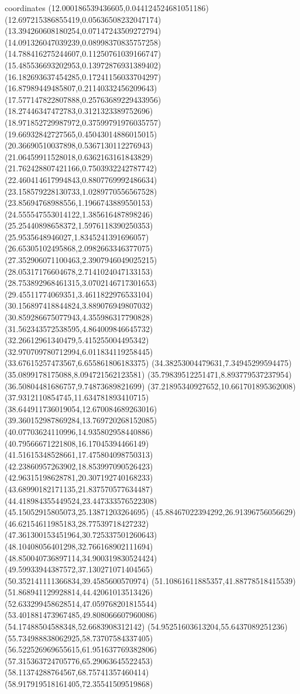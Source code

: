 coordinates {%
(12.000186539436605,0.044124524681051186)
(12.697215386855419,0.05636508232047174)
(13.394260608180254,0.07147243509272794)
(14.091326047039239,0.08998370835757258)
(14.788416275244607,0.11250761039166747)
(15.485536693202953,0.13972876931389402)
(16.182693637454285,0.17241156033704297)
(16.87989449485807,0.21140332456209643)
(17.577147822807888,0.25763689229433956)
(18.27446347472783,0.3121323389752696)
(18.971852729987972,0.37599791976035757)
(19.66932842727565,0.45043014886015015)
(20.36690510037898,0.5367130112276943)
(21.06459911528018,0.6362163161843829)
(21.762428807421166,0.7503932242787742)
(22.460414617994843,0.8807769992486634)
(23.158579228130733,1.0289770556567528)
(23.85694768988556,1.1966743889550153)
(24.555547553014122,1.385616487898246)
(25.25440898658372,1.5976118390250353)
(25.9535648946027,1.8345241391696057)
(26.65305102495868,2.0982663346377075)
(27.352906071100463,2.3907946049025215)
(28.05317176604678,2.7141024047133153)
(28.753892968461315,3.0702146717301653)
(29.45511774069351,3.4611822976533104)
(30.156897418844824,3.889076949807032)
(30.859286675077943,4.355986317790828)
(31.562343572538595,4.864009846645732)
(32.26612961340479,5.415255004495342)
(32.970709780712994,6.011834119258445)
(33.67615257473567,6.655861806183375)
(34.38253004479631,7.34945299594475)
(35.0899178175088,8.094721562123581)
(35.79839512251471,8.893779537237954)
(36.50804481686757,9.74873689821699)
(37.21895340927652,10.661701895362008)
(37.9312110854745,11.634781893410715)
(38.644911736019054,12.670084689263016)
(39.360152987869284,13.769720268152085)
(40.07703624110996,14.935802958440886)
(40.79566671221808,16.17045394466149)
(41.51615348528661,17.475804098750313)
(42.23860957263902,18.853997090526423)
(42.96315198628781,20.307192740168233)
(43.68990182171135,21.837570577634487)
(44.418984355449524,23.447333576522308)
(45.15052915805073,25.13871203264695)
(45.88467022394292,26.91396756056629)
(46.62154611985183,28.77539718427232)
(47.361300153451964,30.725337501260643)
(48.10408056401298,32.766168902111694)
(48.850040736897114,34.900319830524424)
(49.59933944387572,37.130271071404565)
(50.352141111366834,39.4585600570974)
(51.10861611885357,41.88778518415539)
(51.868941129928814,44.42061013513426)
(52.633299458628514,47.059768201815544)
(53.401881473967485,49.808066607960086)
(54.17488504588348,52.6683908312142)
(54.95251603613204,55.6437089251236)
(55.734988838062925,58.73707584337405)
(56.522526969655615,61.951637769382806)
(57.315363724705776,65.29063645522453)
(58.11374288764567,68.75741357460414)
(58.917919518161405,72.35541509519868)
}
